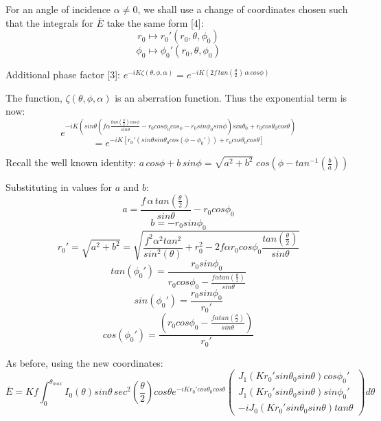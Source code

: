 \documentclass{article}
\begin{document}
    For an angle of incidence \(\alpha \neq 0\), we shall use a change of coordinates chosen such that the integrals for \(\bar{E}\) take the same form [4]:
    \[r_0 \mapsto r_0'(r_0,\theta,\phi_0)\]
    \[\phi_0 \mapsto \phi_0'(r_0,\theta,\phi_0)\]

    Additional phase factor [3]: \(e^{-iK\zeta(\theta,\phi,\alpha)} = e^{-iK(2f\,tan\left(\frac{\theta}{2}\right)\, \alpha \, cos\phi)}\)

    The function, \(\zeta(\theta,\phi,\alpha)\) is an aberration function. Thus the exponential term is now:
    \[e^{-iK(sin\theta(f\alpha \frac{tan\left(\frac{\theta}{2}\right)cos\phi}{sin\theta} - r_0 cos\phi_0 cos_\phi - r_0 sin\phi_0 sin\phi)sin\theta_0 + r_0 cos\theta_0 cos\theta)}\]
    \[= e^{-iK[r_0'(sin\theta sin\theta_0 cos(\phi - \phi_0'))+r_0 cos\theta_0 cos\theta]}\]
    
    Recall the well known identity: \(a\,cos\phi + b\,sin\phi = \sqrt{a^2 + b^2} \; cos\left(\phi - tan^{-1}\left(\frac{b}{a}\right)\right)\)

    Substituting in values for \(a\) and \(b\):
    \[a = \frac{f\,\alpha\,tan\left(\frac{\theta}{2}\right)}{sin\theta} - r_0 cos\phi_0\]
    \[b = -r_0 sin\phi_0\]
    \[r_0' = \sqrt{a^2 + b^2} = \sqrt{\frac{f^2 \alpha^2 tan^2}{sin^2(\theta)}+r_0^2 - 2f\alpha r_0 cos\phi_0 \frac{tan\left(\frac{\theta}{2}\right)}{sin\theta}}\]
    \[tan(\phi_0') = \frac{r_0 sin\phi_0}{r_0 cos\phi_0 - \frac{f \alpha tan\left(\frac{\theta}{2}\right)}{sin\theta}}\]
    \[sin(\phi_0') = \frac{r_0 sin\phi_0}{r_0'}\]
    \[cos(\phi_0') = \frac{(r_0 cos\phi_0 - \frac{f \alpha tan\left(\frac{\theta}{2}\right)}{sin\theta})}{r_0'}\]

    As before, using the new coordinates:
    \[\bar{E} = Kf \int_0^{\theta_{max}} I_0(\theta) sin\theta \, sec^2\left(\frac{\theta}{2}\right) cos\theta e^{-iK r_0' cos\theta_0 cos\theta} \begin{pmatrix} J_1(Kr_0' sin\theta_0 sin\theta)cos\phi_0' \\ J_1(Kr_0' sin\theta_0sin\theta)sin\phi_0' \\ -i J_0(Kr_0' sin\theta_0sin\theta)tan\theta \end{pmatrix} d\theta \]
\end{document}

